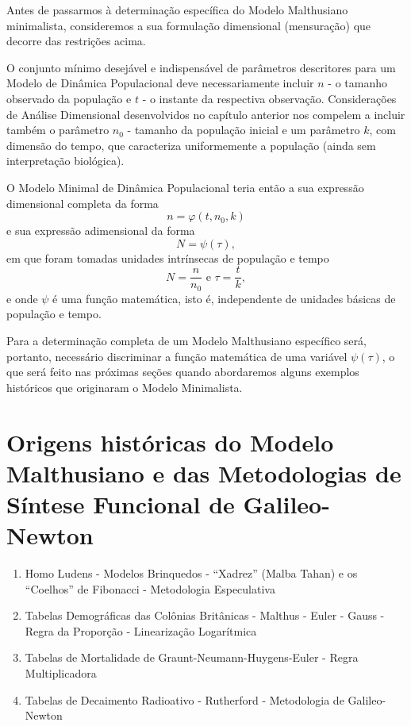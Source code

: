     Antes de passarmos à determinação específica do Modelo Malthusiano minimalista, consideremos a sua formulação dimensional (mensuração) que decorre das restrições acima.

    O conjunto mínimo desejável e indispensável de parâmetros descritores para um Modelo de Dinâmica Populacional deve necessariamente incluir \(n\) - o tamanho observado da população e \(t\) - o instante da respectiva observação. Considerações de Análise Dimensional desenvolvidos no capítulo anterior nos compelem a incluir também o parâmetro \(n_0\) - tamanho da população inicial e um parâmetro \(k\), com dimensão do tempo, que caracteriza uniformemente a população (ainda sem interpretação biológica).
    
    O Modelo Minimal de Dinâmica Populacional teria então a sua expressão dimensional completa da forma
    \[n = \varphi(t, n_0, k)\]
    e sua expressão adimensional da forma
    \[N =\psi(\tau),\]
    em que foram tomadas unidades intrínsecas de população e tempo
    \[N = \dfrac{n}{n_0} \mbox{ e } \tau = \dfrac{t}{k},\]
    e onde \(\psi\) é uma função matemática, isto é, independente de unidades básicas de população e tempo.
    
    Para a determinação completa de um Modelo Malthusiano específico será, portanto, necessário discriminar a função matemática de uma variável \(\psi(\tau)\), o que será feito nas próximas seções quando abordaremos alguns exemplos históricos que originaram o Modelo Minimalista.

\section{Origens históricas do Modelo Malthusiano e das Metodologias de Síntese Funcional de Galileo-Newton}

\begin{enumerate}
\item Homo Ludens - Modelos Brinquedos - ``Xadrez'' (Malba Tahan) e os ``Coelhos'' de Fibonacci - Metodologia Especulativa
\item Tabelas Demográficas das Colônias Britânicas - Malthus - Euler - Gauss - Regra da Proporção - Linearização Logarítmica
\item Tabelas de Mortalidade de Graunt-Neumann-Huygens-Euler - Regra Multiplicadora
\item Tabelas de Decaimento Radioativo - Rutherford - Metodologia de Galileo-Newton
\end{enumerate}

